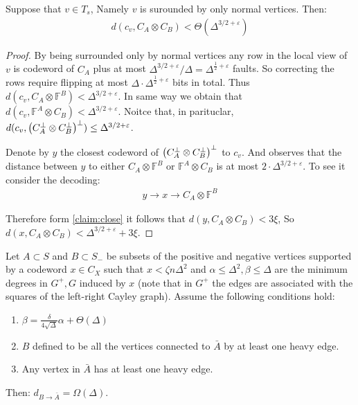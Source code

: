 \begin{claim}
  \label{claim:closeto}
  Suppose that $v \in T_{s}$, Namely $v$ is surounded by only normal vertices. Then:
  \begin{equation*}
    \begin{split}
      d\left( c_{v}, C_{A}\otimes C_{B}\right) < \Theta\left( \Delta^{3/2+\varepsilon} \right)
    \end{split}
  \end{equation*} 
 \end{claim}
\begin{proof}
  By being surrounded only by normal vertices any row in the local view of $v$ is codeword of $C_{A}$ plus at most $\Delta^{3/2 + \varepsilon}/\Delta = \Delta^{\frac{1}{2}+\varepsilon}$ faults. So correcting the rows require flipping at most $\Delta \cdot \Delta^{\frac{1}{2} + \varepsilon}$ bits in total.  Thus $d\left(c_{v}, C_{A}\otimes \mathbb{F}^{B}\right) < \Delta^{3/2 + \varepsilon}$. In same way we obtain that $d\left(c_{v},  \mathbb{F}^{A} \otimes C_{B}\right) < \Delta^{3/2 + \varepsilon}$. Noitce that, in parituclar, $d(c_{v}, \left( C_{A}^{\perp}\otimes C_{B}^{\perp} \right)^{\perp}) \le \Delta^{3/2 + \varepsilon}$.

  Denote by $y$ the closest codeword of $\left( C_{A}^{\perp}\otimes C_{B}^{\perp} \right)^{\perp}$ to $c_{v}$. And observes that the distance between $y$ to either $C_{A} \otimes \mathbb{F}^{B}$ or $\mathbb{F}^{A}\otimes C_{B}$ is at most $2 \cdot \Delta^{3/2 + \varepsilon}$. To see it consider the decoding: 
  \begin{equation*}
    \begin{split}
  y \rightarrow x \rightarrow C_{A} \otimes \mathbb{F}^{B}   
    \end{split}
  \end{equation*}
  
  Therefore form \cref{claim:close} it follows that $d\left(y, C_{A} \otimes C_{B}\right) < 3 \xi $, So $d\left(x, C_{A} \otimes C_{B}\right) < \Delta^{3/2 + \varepsilon} +  3 \xi $.
     \end{proof}
   
   
 
 \begin{claim}  
   \label{cliam:tech} 
Let $A \subset S$ and $B \subset S_{-}$ be subsets of the positive and negative vertices supported by a codeword $x \in C_{X}$ such that $x < \zeta n \Delta^2$ and $\alpha \le \Delta^2, \beta \le \Delta$ are the minimum degrees in $G^{+}, G$ induced by $x$ (note that in $G^{+}$ the edges are associated with the squares of the left-right Cayley graph). Assume the following conditions hold:
   \begin{enumerate}
     \item $\beta = \frac{\delta}{4 \sqrt{\Delta}}\alpha + \Theta\left( \Delta \right)$
     \item $B$ defined to be all the vertices connected to $\bar{A}$ by at least one heavy edge.
     \item Any vertex in $\bar{A}$ has at least one heavy edge. 
   \end{enumerate}
   Then: $d_{B\rightarrow \bar{A}} = \Omega\left( \Delta \right)$.  
 \end{claim}


